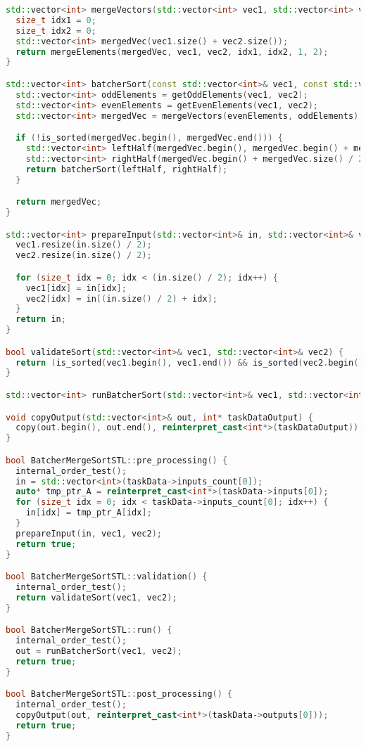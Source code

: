 \documentclass{report}
\begin{document}
\begin{lstlisting}[language=C++,caption=STL версия]
std::vector<int> mergeVectors(std::vector<int> vec1, std::vector<int> vec2) {
  size_t idx1 = 0;
  size_t idx2 = 0;
  std::vector<int> mergedVec(vec1.size() + vec2.size());
  return mergeElements(mergedVec, vec1, vec2, idx1, idx2, 1, 2);
}

std::vector<int> batcherSort(const std::vector<int>& vec1, const std::vector<int>& vec2) {
  std::vector<int> oddElements = getOddElements(vec1, vec2);
  std::vector<int> evenElements = getEvenElements(vec1, vec2);
  std::vector<int> mergedVec = mergeVectors(evenElements, oddElements);

  if (!is_sorted(mergedVec.begin(), mergedVec.end())) {
    std::vector<int> leftHalf(mergedVec.begin(), mergedVec.begin() + mergedVec.size() / 2);
    std::vector<int> rightHalf(mergedVec.begin() + mergedVec.size() / 2, mergedVec.end());
    return batcherSort(leftHalf, rightHalf);
  }

  return mergedVec;
}

std::vector<int> prepareInput(std::vector<int>& in, std::vector<int>& vec1, std::vector<int>& vec2) {
  vec1.resize(in.size() / 2);
  vec2.resize(in.size() / 2);

  for (size_t idx = 0; idx < (in.size() / 2); idx++) {
    vec1[idx] = in[idx];
    vec2[idx] = in[(in.size() / 2) + idx];
  }
  return in;
}

bool validateSort(std::vector<int>& vec1, std::vector<int>& vec2) {
  return (is_sorted(vec1.begin(), vec1.end()) && is_sorted(vec2.begin(), vec2.end()));
}

std::vector<int> runBatcherSort(std::vector<int>& vec1, std::vector<int>& vec2) { return batcherSort(vec1, vec2); }

void copyOutput(std::vector<int>& out, int* taskDataOutput) {
  copy(out.begin(), out.end(), reinterpret_cast<int*>(taskDataOutput));
}

bool BatcherMergeSortSTL::pre_processing() {
  internal_order_test();
  in = std::vector<int>(taskData->inputs_count[0]);
  auto* tmp_ptr_A = reinterpret_cast<int*>(taskData->inputs[0]);
  for (size_t idx = 0; idx < taskData->inputs_count[0]; idx++) {
    in[idx] = tmp_ptr_A[idx];
  }
  prepareInput(in, vec1, vec2);
  return true;
}

bool BatcherMergeSortSTL::validation() {
  internal_order_test();
  return validateSort(vec1, vec2);
}

bool BatcherMergeSortSTL::run() {
  internal_order_test();
  out = runBatcherSort(vec1, vec2);
  return true;
}

bool BatcherMergeSortSTL::post_processing() {
  internal_order_test();
  copyOutput(out, reinterpret_cast<int*>(taskData->outputs[0]));
  return true;
}
\end{lstlisting}
\end{document}

